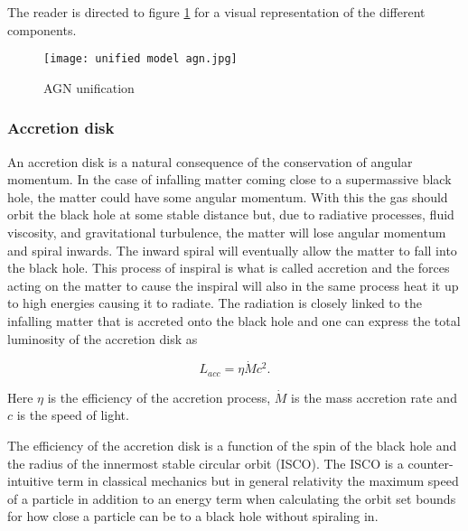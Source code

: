 The reader is directed to figure \ref{fig:my_label} for a visual representation of the different components.


\begin{figure}
    \centering
    \texttt{[image: unified model agn.jpg]}
    \caption{AGN unification}
    \label{fig:my_label}
\end{figure}

\subsubsection{Accretion disk}
An accretion disk is a natural consequence of the conservation of angular momentum. In the case of infalling 
matter coming close to a supermassive black hole, the matter could have some angular momentum. With this the gas should orbit the black hole at some stable distance but, due to radiative processes, fluid viscosity, and gravitational turbulence, 
the matter will lose angular momentum and spiral inwards. The inward spiral will eventually allow the matter to fall into the black hole. 
This process of inspiral is what is called accretion and the forces acting on the matter to cause the inspiral 
will also in the same process heat it up to high energies causing it to radiate. The radiation is closely linked to the 
infalling matter that is accreted onto the black hole and one can express the total luminosity of the accretion disk as 

\begin{equation}
    L_{acc} = \eta \dot{M}c^2.
    \label{eq:accretion_luminosity}
\end{equation}

Here $\eta$ is the efficiency of the accretion process, $\dot{M}$ is the mass accretion rate and $c$ is the speed of light.

The efficiency of the accretion disk is a function of the spin of the black hole and the radius of the innermost stable circular orbit (ISCO).
The ISCO is a counter-intuitive term in classical mechanics but in general relativity the maximum speed of a particle 
in addition to an energy term when calculating the orbit set bounds for how close a particle can be to 
a black hole without spiraling in. %




